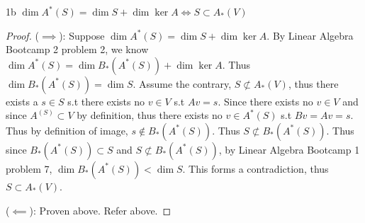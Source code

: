 \documentclass{article}
\begin{document}
\begin{claim}{1b}
	$\dim A^*(S) = \dim S + \dim \ker{A} \iff S \subset A_*(V)$
\end{claim}
\begin{proof}
	($\implies$): Suppose $\dim A^*(S) = \dim S + \dim \ker{A}$. By Linear Algebra Bootcamp 2 problem 2, we know $\dim A^*(S) = \dim B_*(A^*(S)) + \dim \ker{A}$. Thus $\dim B_*(A^*(S)) = \dim S$. Assume the contrary, $S \not \subset A_*(V)$, thus there exists a $s \in S$ s.t there exists no $v \in V$ s.t $Av = s$. Since there exists no $v \in V$ and since $A^(S) \subset V$ by definition, thus there exists no $v \in A^*(S)$ s.t $Bv = Av = s$. Thus by definition of image, $s \not \in  B_*(A^*(S))$. Thus $S \not \subset B_*(A^*(S))$.  Thus since $B_*(A^*(S)) \subset S$ and $S \not \subset B_*(A^*(S))$, by Linear Algebra Bootcamp 1 problem 7, $\dim B_*(A^*(S)) < \dim S$. This forms a contradiction, thus $S \subset A_*(V)$.

	($\impliedby$): Proven above. Refer above.
\end{proof}

\bigskip
\end{document}
